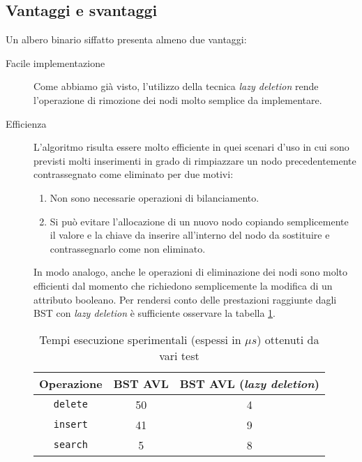 \documentclass[10pt,a4paper,titlepage]{article}
\begin{document}
\subsection{Vantaggi e svantaggi}

Un albero binario siffatto presenta almeno due vantaggi:

\begin{description}

\item[Facile implementazione] Come abbiamo già visto, l'utilizzo della tecnica \textit{lazy deletion} rende l'operazione di rimozione dei nodi molto semplice da implementare.

\item[Efficienza] L'algoritmo risulta essere molto efficiente in quei scenari d'uso in cui sono previsti molti inserimenti in grado di rimpiazzare un nodo precedentemente contrassegnato come eliminato per due motivi:
\begin{enumerate}
\item Non sono necessarie operazioni di bilanciamento.
\item Si può evitare l'allocazione di un nuovo nodo copiando semplicemente il valore e la chiave da inserire all'interno del nodo da sostituire e contrassegnarlo come non eliminato.
\end{enumerate}
In modo analogo, anche le operazioni di eliminazione dei nodi sono molto efficienti dal momento che richiedono semplicemente la modifica di un attributo booleano. Per rendersi conto delle prestazioni raggiunte dagli BST con \textit{lazy deletion} è sufficiente osservare la tabella \ref{table:diana}.

\begin{table}
\caption{Tempi esecuzione sperimentali (espessi in $\mu s$) ottenuti da vari test}\label{table:diana}
\begin{center}
\begin{tabular}{ccc}

\toprule
\textbf{Operazione} & \textbf{BST AVL} & \textbf{BST AVL (\textit{lazy deletion})} \\

\midrule

\texttt{delete} & 50 & 4 \\
\texttt{insert} & 41 & 9 \\
\texttt{search} & 5 & 8 \\

\bottomrule
\end{tabular}
\end{center}
\end{table}







\end{description}
\end{document}

